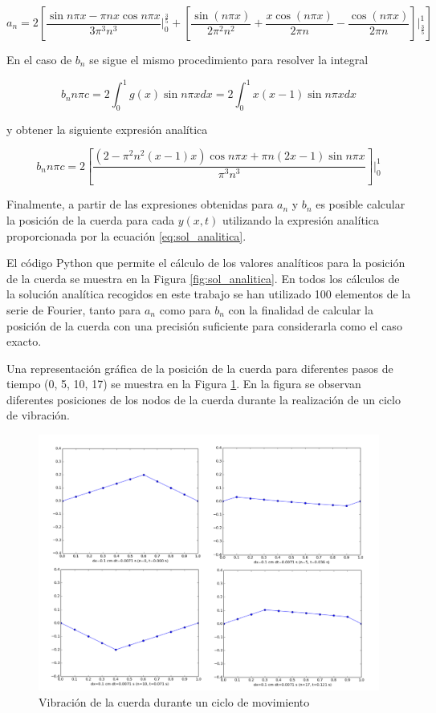\documentclass[11pt]{article}
\begin{document}
\begin{equation}
	a_n = 2 [\frac{\sin{n\pi{x}} - \pi{n}x\cos{n\pi{x}}}{3\pi^3n^3}\rvert_0^\frac{3}{5}
	+ [\frac{\sin(n\pi{x})}{2\pi^2n^2} + \frac{x\cos(n\pi{x})}{2\pi{n}} - \frac{\cos(n\pi{x})}{2\pi{n}}]\rvert_{\frac{3}{5}}^1]
\end{equation}

En el caso de $b_n$ se sigue el mismo procedimiento para resolver la integral

\begin{equation}
	b_n n\pi{c} = 2 \int_0^1 g(x) \sin{n\pi{x}}dx = 2 \int_0^1 x(x-1) \sin{n\pi{x}}dx 
\end{equation}

y obtener la siguiente expresión analítica

\begin{equation}
	b_n n\pi{c} = 2[\frac{(2 - \pi^2n^2(x-1)x)\cos{n\pi{x}} + \pi{n}(2x - 1)\sin{n\pi{x}}}{\pi^3n^3}]\rvert_0^1 
\end{equation}

Finalmente, a partir de las expresiones obtenidas para $a_n$ y $b_n$ es posible calcular
la posición de la cuerda para cada $y(x,t)$ utilizando la expresión analítica proporcionada
por la ecuación \eqref{eq:sol_analitica}.

El código Python que permite el cálculo de los valores analíticos para la posición de la
cuerda se muestra en la Figura \ref{fig:sol_analitica}. En todos los cálculos de la solución
analítica recogidos en este trabajo se han utilizado 100 elementos de la serie de Fourier,
tanto para $a_n$ como para $b_n$ con la finalidad de calcular la posición de la cuerda con
una precisión suficiente para considerarla como el caso exacto.

Una representación gráfica de la posición de la cuerda para diferentes pasos de tiempo
(0, 5, 10, 17) se muestra en la Figura \ref{fig:graficas}. En la figura se observan
diferentes posiciones de los nodos de la cuerda durante la realización de un ciclo de
vibración.

\begin{figure}
\centering
\includegraphics[width=1.0\linewidth]{graficas.pdf}
\caption{Vibración de la cuerda durante un ciclo de movimiento}
\label{fig:graficas}
\end{figure}
\end{document}
